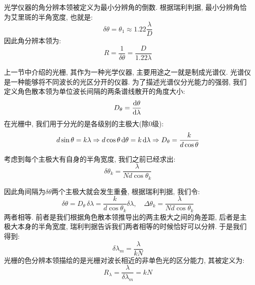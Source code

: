 光学仪器的角分辨本领被定义为最小分辨角的倒数. 根据瑞利判据, 最小分辨角恰为艾里斑的半角宽度, 也就是:
\[
\delta \theta = \theta_1 \approx 1.22\frac{\lambda}{D}
\]
因此角分辨本领为:
\[
R = \frac{1}{\delta \theta}  = \frac{D}{1.22\lambda}
\]

上一节中介绍的光栅, 其作为一种光学仪器, 主要用途之一就是制成光谱仪. 光谱仪是一种能够将不同波长的光区分开的仪器. 为了描述光谱仪分光能力的强弱, 我们定义角色散本领为单位波长间隔的两条谱线散开的角度大小:
\[
D_\theta = \frac{\mathop{}\!\mathrm{d} \theta}{\mathop{}\!\mathrm{d} \lambda}
\]
在光栅中, 我们用于分光的是各级别的主极大(除0级):
\[
d\sin\theta = k \lambda \Rightarrow d\cos\theta\mathop{}\!\mathrm{d}\theta = k \mathop{}\!\mathrm{d} \lambda \Rightarrow D_\theta =\frac{k}{d \cos\theta}
\]

考虑到每个主极大有自身的半角宽度, 我们之前已经求出:
\[
\delta \theta_k = \frac{\lambda}{Nd\cos\theta_k}
\]

因此角间隔为$\delta \theta$两个主极大就会发生重叠, 根据瑞利判据, 我们令:
\[
\delta \theta = D_\theta\,\delta \lambda = \frac{k}{d\cos\theta_k}\delta \lambda, \quad \Delta \theta_k = \frac{\lambda}{Nd \cos\theta_k}
\]
两者相等. 前者是我们根据角色散本领推导出的两主极大之间的角差距, 后者是主极大本身的半角宽度, 瑞利判据告诉我们两者相等的时候恰好可以分辨. 于是我们得到:
\[
\delta \lambda_m = \frac{\lambda}{kN}
\]
光栅的色分辨本领描绘的是光栅对波长相近的非单色光的区分能力, 其被定义为:
\[
R_\lambda = \frac{\lambda}{\delta \lambda_m}=kN
\]

